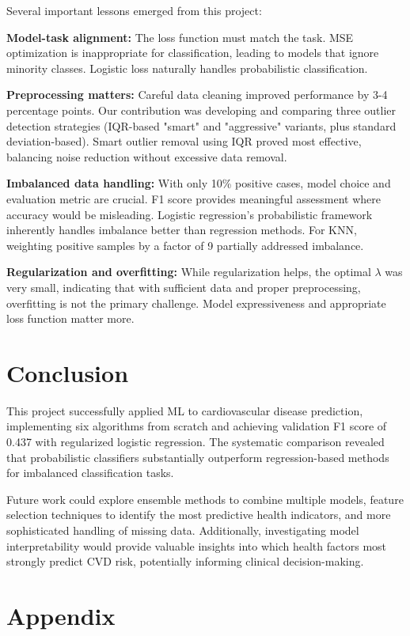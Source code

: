 \documentclass[10pt,conference,compsocconf]{IEEEtran}
\begin{document}
Several important lessons emerged from this project:

\textbf{Model-task alignment:} The loss function must match the task. MSE optimization is inappropriate for classification, leading to models that ignore minority classes. Logistic loss naturally handles probabilistic classification.

\textbf{Preprocessing matters:} Careful data cleaning improved performance by 3-4 percentage points. Our contribution was developing and comparing three outlier detection strategies (IQR-based "smart" and "aggressive" variants, plus standard deviation-based). Smart outlier removal using IQR proved most effective, balancing noise reduction without excessive data removal.

\textbf{Imbalanced data handling:} With only 10\% positive cases, model choice and evaluation metric are crucial. F1 score provides meaningful assessment where accuracy would be misleading. Logistic regression's probabilistic framework inherently handles imbalance better than regression methods. For KNN, weighting positive samples by a factor of 9 partially addressed imbalance.

\textbf{Regularization and overfitting:} While regularization helps, the optimal $\lambda$ was very small, indicating that with sufficient data and proper preprocessing, overfitting is not the primary challenge. Model expressiveness and appropriate loss function matter more.

\section{Conclusion}

This project successfully applied ML to cardiovascular disease prediction, implementing six algorithms from scratch and achieving validation F1 score of 0.437 with regularized logistic regression. The systematic comparison revealed that probabilistic classifiers substantially outperform regression-based methods for imbalanced classification tasks.

Future work could explore ensemble methods to combine multiple models, feature selection techniques to identify the most predictive health indicators, and more sophisticated handling of missing data. Additionally, investigating model interpretability would provide valuable insights into which health factors most strongly predict CVD risk, potentially informing clinical decision-making.

\clearpage
\section{Appendix}
\end{document}
